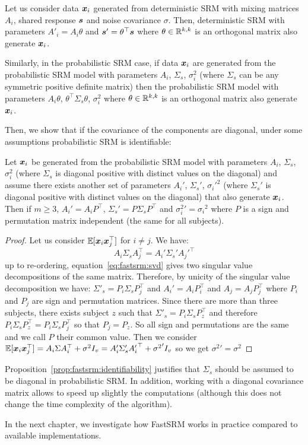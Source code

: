 Let us consider data $\boldsymbol{x}_i$ generated from deterministic SRM with
mixing matrices $A_i$, shared response $\boldsymbol{s}$ and noise covariance $\sigma$.
Then, deterministic SRM with parameters $A'_i = A_i \theta$ and $\boldsymbol{s}' = \theta^{\top} \boldsymbol{s}$ where
$\theta \in \mathbb{R}^{k, k}$ is an orthogonal matrix also
generate $\boldsymbol{x}_i$.

Similarly, in the probabilistic SRM case, if data $\boldsymbol{x}_i$ are generated from the
probabilistic SRM model with 
parameters $A_i$, $\Sigma_s$, $\sigma_i^2$ (where $\Sigma_s$ can be any
symmetric positive definite
matrix) then the probabilistic SRM model with parameters $A_i\theta$, $\theta^{\top} \Sigma_s \theta$, $\sigma_i^2$  where
$\theta \in \mathbb{R}^{k, k}$ is an orthogonal matrix also generate $\boldsymbol{x}_i$.

Then, we show that if the covariance of the components are diagonal, under some
assumptions probabilistic SRM is identifiable:
\begin{prop}
  \label{prop:fastsrm:identifiability}
  Let $\boldsymbol{x}_i$ be generated from the probabilistic SRM model with parameters 
  $A_i$, $\Sigma_s$, $\sigma_i^2$ (where $\Sigma_s$ is diagonal positive with
  distinct values on the diagonal) and assume there exists another set of parameters $A_i'$, $\Sigma_s'$,
  ${\sigma_i'}^2$ (where $\Sigma_s'$ is diagonal positive with
  distinct values on the diagonal) that also generate $\boldsymbol{x}_i$.
Then if $m\geq 3$, $A_i' = A_i P^{\top}$, $\Sigma_s'= P\Sigma_sP^{\top}$ and
  ${\sigma_i^2}' = {\sigma_i}^2$ where $P$ is a sign and permutation matrix
  independent (the same for all subjects).
\end{prop}
\begin{proof}
  Let us consider $\mathbb{E}[\boldsymbol{x}_i \boldsymbol{x}_j^{\top}]$ for $i \neq j$.
  We have:
  \begin{equation}
  A_i \Sigma_s A_j^{\top} = A_i' \Sigma_s' {A_j'}^{\top}
  \label{eq:fastsrm:svd}
  \end{equation}
  up to re-ordering, equation~\eqref{eq:fastsrm:svd} gives two singular value
  decompositions of the same matrix.
  Therefore, by unicity of the singular value decomposition we have:
  $\Sigma'_s = P_i \Sigma_s P_j^{\top}$ and $A_i' = A_i P_i^{\top}$ and $A_j =
  A_j P_j^{\top}$ where $P_i$ and $P_j$ are sign and permutation matrices.
  Since there are more than three subjects, there exists subject $z$ such that
  $\Sigma'_s = P_i \Sigma_s P_z^{\top}$ and therefore
  $P_i \Sigma_s P_z^{\top} =  P_i \Sigma_s P_j^{\top}$ so that $P_j =
  P_z$. So all sign and permutations are the same and we call $P$ their
  common value.
  Then we consider
  $\mathbb{E}[\boldsymbol{x}_i \boldsymbol{x}_j^{\top}] = A_i \Sigma A_i^{\top} + \sigma^2 I_v = A_i' \Sigma_s'
  {A_i'}^{\top} + {\sigma^2}' I_v$
  so we get ${\sigma^2}' = {\sigma^2}$
\end{proof}

Proposition~\eqref{prop:fastsrm:identifiability} justifies that
$\Sigma_s$ should be assumed to be diagonal in probabilistic SRM.
In addition, working with a diagonal covariance matrix allows to speed up
slightly the computations (although this does not change the time complexity of
the algorithm).

In the next chapter, we investigate how FastSRM works in practice compared to
available implementations.
